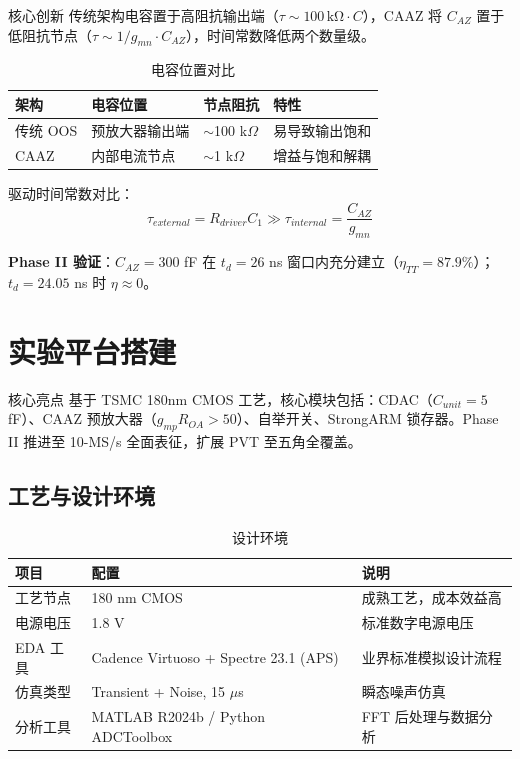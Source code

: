 \documentclass[11pt,a4paper,UTF8]{ctexart}
\begin{document}
\begin{prinbox}{核心创新}
传统架构电容置于高阻抗输出端（$\tau \sim 100\,\mathrm{k\Omega} \cdot C$），CAAZ 将 $C_{AZ}$ 置于低阻抗节点（$\tau \sim 1/g_{mn} \cdot C_{AZ}$），时间常数降低两个数量级。
\end{prinbox}

\begin{table}[htbp]\centering\caption{电容位置对比}\label{tab:cap}\small
\begin{tabular}{llll}\toprule
\textbf{架构} & \textbf{电容位置} & \textbf{节点阻抗} & \textbf{特性} \\\midrule
传统 OOS & 预放大器输出端 & $\sim$100 k$\Omega$ & 易导致输出饱和 \\
CAAZ & 内部电流节点 & $\sim$1 k$\Omega$ & 增益与饱和解耦 \\\bottomrule
\end{tabular}
\end{table}

驱动时间常数对比：
$$\tau_{external} = R_{driver} C_1 \gg \tau_{internal} = \frac{C_{AZ}}{g_{mn}}$$

\textbf{Phase II 验证}：$C_{AZ}=300$ fF 在 $t_d=26$ ns 窗口内充分建立（$\eta_{TT}=87.9\%$）；$t_d=24.05$ ns 时 $\eta\approx0$。

\section{实验平台搭建}
\label{sec:platform}

\begin{findbox}{核心亮点}
基于 TSMC 180nm CMOS 工艺，核心模块包括：CDAC（$C_{unit}=5$ fF）、CAAZ 预放大器（$g_{mp}R_{OA}>50$）、自举开关、StrongARM 锁存器。Phase II 推进至 10-MS/s 全面表征，扩展 PVT 至五角全覆盖。
\end{findbox}

\subsection{工艺与设计环境}

\begin{table}[htbp]\centering\caption{设计环境}\label{tab:env}\small
\begin{tabular}{lll}\toprule
\textbf{项目} & \textbf{配置} & \textbf{说明} \\\midrule
工艺节点 & 180 nm CMOS & 成熟工艺，成本效益高 \\
电源电压 & 1.8 V & 标准数字电源电压 \\
EDA 工具 & Cadence Virtuoso + Spectre 23.1 (APS) & 业界标准模拟设计流程 \\
仿真类型 & Transient + Noise, 15 $\mu$s & 瞬态噪声仿真 \\
分析工具 & MATLAB R2024b / Python ADCToolbox & FFT 后处理与数据分析 \\\bottomrule
\end{tabular}
\end{table}
\end{document}
